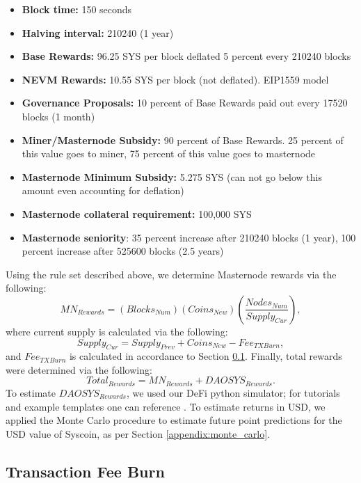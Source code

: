 \documentclass[journal,twocolumn,12pt]{ieeesyscoin}
\begin{document}
\begin{itemize}
\item \textbf{Block time:} 150 seconds
\item \textbf{Halving interval:} 210240 (1 year)
\item \textbf{Base Rewards:}  96.25 SYS per block deflated 5 percent every 210240 blocks
\item \textbf{NEVM Rewards:}  10.55 SYS per block (not deflated). EIP1559 model
\item \textbf{Governance Proposals:}  10 percent of Base Rewards paid out every 17520 blocks (1 month)
\item \textbf{Miner/Masternode Subsidy:}  90 percent of Base Rewards. 25 percent of this value goes to miner, 75 percent of this value goes to masternode
\item \textbf{Masternode Minimum Subsidy:} 5.275 SYS (can not go below this amount even accounting for deflation)
\item \textbf{Masternode collateral requirement:} 100,000 SYS
\item \textbf{Masternode seniority}: 35 percent increase after 210240 blocks (1 year), 100 percent increase after 525600 blocks (2.5 years)
\end{itemize}
Using the rule set described above, we determine Masternode rewards via the following: 
\begin{equation*}
MN_{Rewards} = (Blocks_{Num}) (Coins_{New}) \left(\frac{Nodes_{Num}}{Supply_{Cur}}\right),
\end{equation*}
where current supply is calculated via the following:
\begin{equation*}
Supply_{Cur} = Supply_{Prev} + Coins_{New} - Fee_{TXBurn},
\end{equation*}
and $Fee_{TXBurn}$ is calculated in accordance to Section \ref{appendix:tx_fee_burn}. Finally, total rewards were determined via the following: 
\begin{equation*}
Total_{Rewards} = MN_{Rewards} + DAOSYS_{Rewards}. 
\end{equation*}
To estimate $DAOSYS_{Rewards}$, we used our DeFi python simulator; for tutorials and example templates one can reference \cite{Moo22B}. To estimate returns in USD, we applied the Monte Carlo procedure to estimate future point predictions for the USD value of Syscoin, as per Section \ref{appendix:monte_carlo}.

\subsection{Transaction Fee Burn}
\label{appendix:tx_fee_burn}
\end{document}
